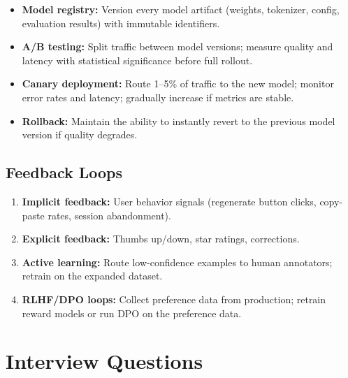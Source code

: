 \begin{itemize}
    \item \textbf{Model registry:}  Version every model artifact (weights, tokenizer,
          config, evaluation results) with immutable identifiers.
    \item \textbf{A/B testing:}  Split traffic between model versions; measure
          quality and latency with statistical significance before full rollout.
    \item \textbf{Canary deployment:}  Route 1--5\% of traffic to the new model;
          monitor error rates and latency; gradually increase if metrics are stable.
    \item \textbf{Rollback:}  Maintain the ability to instantly revert to the previous
          model version if quality degrades.
\end{itemize}

\subsection{Feedback Loops}

\begin{enumerate}
    \item \textbf{Implicit feedback:}  User behavior signals (regenerate button clicks,
          copy-paste rates, session abandonment).
    \item \textbf{Explicit feedback:}  Thumbs up/down, star ratings, corrections.
    \item \textbf{Active learning:}  Route low-confidence examples to human annotators;
          retrain on the expanded dataset.
    \item \textbf{RLHF/DPO loops:}  Collect preference data from production; retrain
          reward models or run DPO on the preference data.
\end{enumerate}


\section{Interview Questions}
\label{sec:production_interview_questions}

